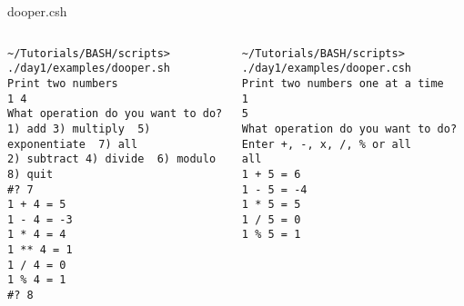 \documentclass[slidestop,mathserif,compress,xcolor=svgnames]{beamer}
\newenvironment{bblock}[0]
{
\begin{beamerboxesrounded}[upper=uppercol1,lower=lowercol1,shadow=true]}
{\end{beamerboxesrounded}}
\newenvironment{eblock}[0]
{
\begin{beamerboxesrounded}[upper=uppercol2,lower=lowercol2,shadow=true]}
{\end{beamerboxesrounded}}
\begin{document}
\begin{frame}
{\begin{columns}
      \vspace{-0.5cm}
      \begin{bblock}{dooper.csh}
        
      \end{bblock}
    \end{columns}
  }
  \framebreak
  \begin{columns}
    \begin{eblock}{}
      \begin{lstlisting}
~/Tutorials/BASH/scripts> ./day1/examples/dooper.sh
Print two numbers
1 4
What operation do you want to do?
1) add 3) multiply  5) exponentiate  7) all
2) subtract 4) divide  6) modulo   8) quit
#? 7
1 + 4 = 5
1 - 4 = -3
1 * 4 = 4
1 ** 4 = 1
1 / 4 = 0
1 % 4 = 1
#? 8
      \end{lstlisting}
    \end{eblock}
    \begin{bblock}{}
      \begin{lstlisting}
~/Tutorials/BASH/scripts> ./day1/examples/dooper.csh 
Print two numbers one at a time
1
5
What operation do you want to do?
Enter +, -, x, /, % or all
all
1 + 5 = 6
1 - 5 = -4
1 * 5 = 5
1 / 5 = 0
1 % 5 = 1
        \end{lstlisting}
    \end{bblock}
  \end{columns}
\end{frame}
\end{document}
